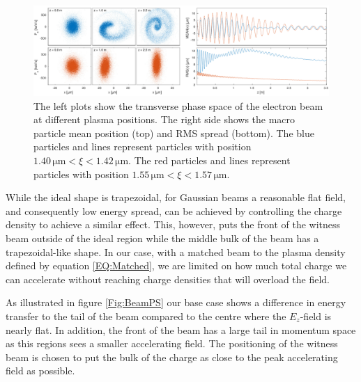 \documentclass[aps,prstab,reprint,amsmath,amssymb,groupedaddress]{revtex4-1}
\newcommand{\unit}[1]{\,\mathrm{#1}}
\begin{document}
\begin{figure}[hbt]
    \includegraphics[width=\linewidth,trim={0mm 0mm 0mm 0mm},clip]{figures/beamFilamentationAll}
    \caption{\label{Fig:BeamFilament} The left plots show the transverse phase space of the electron beam at different
        plasma positions. The right side shows the macro particle mean position (top) and RMS spread (bottom). The blue
        particles and lines represent particles with position $1.40\unit{\mu m} < \xi < 1.42\unit{\mu m}$. The red
        particles and lines represent particles with position $1.55\unit{\mu m} < \xi < 1.57\unit{\mu m}$.}
\end{figure}

While the ideal shape is trapezoidal, for Gaussian beams a reasonable flat field, and consequently low energy spread,
can be achieved by controlling the charge density to achieve a similar effect. This, however, puts the front of the
witness beam outside of the ideal region while the middle bulk of the beam has a trapezoidal-like shape. In our case,
with a matched beam to the plasma density defined by equation \ref{EQ:Matched}, we are limited on how much total charge
we can accelerate without reaching charge densities that will overload the field.

As illustrated in figure \ref{Fig:BeamPS} our base case shows a difference in energy transfer to the tail of the beam
compared to the centre where the $E_{z}$-field is nearly flat. In addition, the front of the beam has a large tail in
momentum space as this regions sees a smaller accelerating field. The positioning of the witness beam is chosen to put
the bulk of the charge as close to the peak accelerating field as possible.
\end{document}
